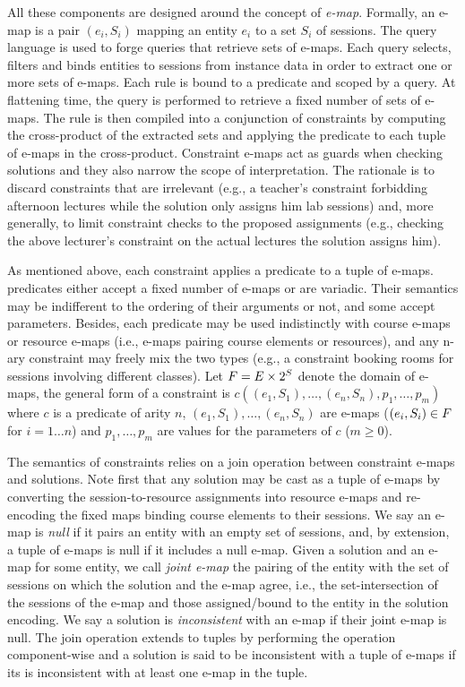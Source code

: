 \documentclass[runningheads]{llncs}
\begin{document}
All these components are designed around the concept of \textit{e-map}.
Formally, an e-map is a pair $(e_i,S_i)$ 
mapping an entity $e_i$ to a set $S_i$ of sessions.
The query language is used to forge queries that retrieve sets of e-maps.
Each query selects, filters and binds entities to sessions from instance data 
in order to extract one or more sets of e-maps.
Each rule is bound to a predicate and scoped by a query.
At flattening time, 
the query is performed to retrieve a fixed number of sets of e-maps.
The rule is then compiled into a conjunction of constraints
by computing the cross-product of the extracted sets and applying the predicate to each tuple of e-maps in the cross-product.
Constraint e-maps act as guards when checking solutions
and they also narrow the scope of interpretation.
The rationale is to discard constraints that are irrelevant
(e.g., a teacher's constraint forbidding afternoon lectures while the solution only assigns him lab sessions)
and, more generally, to limit constraint checks to the proposed assignments
(e.g., checking the above lecturer's constraint on the actual lectures the solution assigns him).


As mentioned above, 
each constraint applies a predicate to a tuple of e-maps.
\UTP{} predicates either accept a fixed number of e-maps or are variadic.
Their semantics may be indifferent to the ordering of their arguments or not,
and some accept parameters.
Besides, each predicate may be used indistinctly
with course e-maps or resource e-maps (i.e., e-maps pairing course elements or resources),
and any n-ary constraint may freely mix the two types
(e.g., a constraint booking rooms for sessions involving different classes).
Let ${F}=E\times{2^{S}}$ denote the domain of e-maps,
the general form of a constraint is
$c((e_1,S_1),\ldots,(e_n,S_n),p_1,\ldots,p_m)$ where 
$c$ is a predicate of arity $n$,
$(e_1,S_1),\ldots,(e_n,S_n)$ are e-maps ($(e_i,S_i)\in{F}$ for $i=1\ldots n$) 
and 
$p_1,\ldots,p_m$ are values for the parameters of $c$ ($m\geq0$).

The semantics of constraints relies on a join operation between constraint e-maps and solutions.
Note first that any solution may be cast as a tuple of e-maps 
by converting the session-to-resource assignments into resource e-maps
and re-encoding the fixed maps binding course elements to their sessions.
We say an e-map is \textit{null} if it pairs an entity with an empty set of sessions,
and, by extension, a tuple of e-maps is null if it includes a null e-map.
Given a solution and an e-map for some entity,
we call \textit{joint e-map} the pairing of the entity with the set of sessions
on which the solution and the e-map agree,
i.e., the set-intersection of the sessions of the e-map and those assigned/bound to the entity in the solution encoding.
We say a solution is \textit{inconsistent} with an e-map if their joint e-map is null.
The join operation extends to tuples by performing the operation component-wise
and a solution is said to be inconsistent with a tuple of e-maps 
if its is inconsistent with at least one e-map in the tuple.
\end{document}
